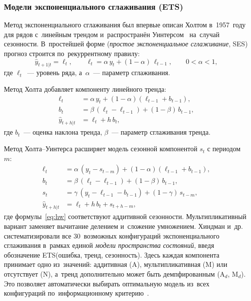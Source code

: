 \subsubsection{Модели экспоненциального сглаживания (ETS)}
\label{sssec:ets}

Метод экспоненциального сглаживания был впервые описан Холтом
в~1957~году~\cite{holt2004forecasting} для рядов с~линейным трендом
и~распространён Уинтерсом~\cite{winters1960forecasting} на~случай
сезонности.  В~простейшей форме (\textit{простое экспоненциальное
сглаживание}, SES) прогноз строится по~рекуррентному правилу:
\begin{equation}
\label{eq:ses}
\hat{y}_{t+1|t} = \ell_t, \qquad
\ell_t = \alpha\, y_t + (1-\alpha)\,\ell_{t-1}, \qquad
0 < \alpha < 1,
\end{equation}
где $\ell_t$~--- уровень ряда, а~$\alpha$~--- параметр сглаживания.

Метод Холта добавляет компоненту линейного тренда:
\begin{align}
\label{eq:holt}
\ell_t &= \alpha\, y_t + (1-\alpha)(\ell_{t-1} + b_{t-1}), \nonumber\\
b_t    &= \beta\,(\ell_t - \ell_{t-1}) + (1-\beta)\,b_{t-1}, \\
\hat{y}_{t+h|t} &= \ell_t + h\, b_t, \nonumber
\end{align}
где $b_t$~--- оценка наклона тренда, $\beta$~--- параметр сглаживания
тренда.

Метод Холта--Уинтерса расширяет модель сезонной компонентой $s_t$ с
периодом~$m$:
\begin{align}
\label{eq:hw}
\ell_t &= \alpha\,(y_t - s_{t-m}) + (1-\alpha)(\ell_{t-1}+b_{t-1}), \nonumber\\
b_t    &= \beta\,(\ell_t - \ell_{t-1}) + (1-\beta)\,b_{t-1}, \\
s_t    &= \gamma\,(y_t - \ell_{t-1} - b_{t-1}) + (1-\gamma)\,s_{t-m}, \nonumber\\
\hat{y}_{t+h|t} &= \ell_t + h\,b_t + s_{t+h-m}, \nonumber
\end{align}
где формулы~\eqref{eq:hw} соответствуют аддитивной сезонности.
Мультипликативный вариант заменяет вычитание делением и~сложение
умножением.  Хиндман и~др.~\cite{hyndman2002ets} систематизировали
все 30~возможных конфигураций экспоненциального сглаживания в~рамках
единой \textit{модели пространства состояний},
введя обозначение ETS(ошибка, тренд, сезонность).  Здесь каждая
компонента принимает одно из~значений: аддитивная (A),
мультипликативная (M) или отсутствует (N), а~тренд дополнительно может
быть демпфированным (A$_d$, M$_d$).  Это позволяет автоматически
выбирать оптимальную модель из~всех конфигураций по~информационному
критерию~\cite{hyndman2008expsmoothing}.

